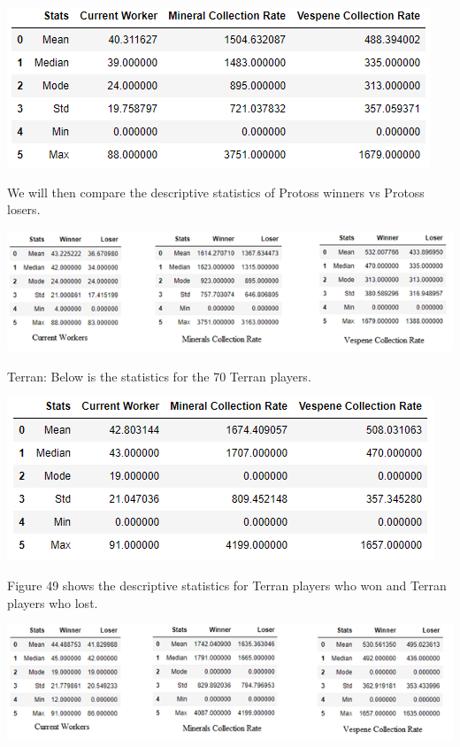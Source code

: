 \documentclass[a4paper,12pt]{report}
\begin{document}
\begin{center}
    \captionsetup{type=figure}
    \includegraphics[width=.9\linewidth]{media/ProtossDescriptive.png}
\end{center}

We will then compare the descriptive statistics of Protoss winners vs Protoss losers. 

\begin{center}
    \captionsetup{type=figure}
    \includegraphics[width=.9\linewidth]{media/ProtossWinnervsLoser.png}
\end{center}

Terran:
Below is the statistics for the 70 Terran players.

\begin{center}
    \captionsetup{type=figure}
    \includegraphics[width=.9\linewidth]{media/TerranDescriptive.png}
\end{center}

Figure 49 shows the descriptive statistics for Terran players who won and Terran players who lost. 

\begin{center}
    \captionsetup{type=figure}
    \includegraphics[width=.9\linewidth]{media/TerranWinnervsLoser.png}
\end{center}
\end{document}
